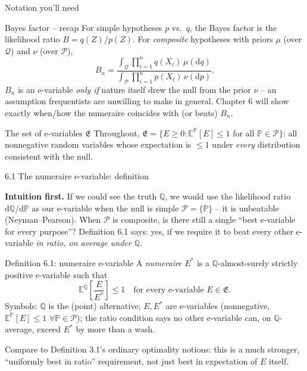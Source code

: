 \documentclass[aspectratio=169,10pt]{beamer}
\newcommand{\bE}{\mathbb{E}}
\newcommand{\bP}{\mathbb{P}}
\newcommand{\bQ}{\mathbb{Q}}
\newcommand{\cP}{\mathcal{P}}
\newcommand{\cQ}{\mathcal{Q}}
\newcommand{\cE}{\mathfrak{E}}
\begin{document}
\begin{frame}[allowframebreaks]{Notation you'll need}
\framebreak

\begin{block}{Bayes factor -- recap}
For simple hypotheses $p$ vs.\ $q$, the Bayes factor is the likelihood
ratio $B = q(Z)/p(Z)$. For \emph{composite} hypotheses with priors
$\mu$ (over $\cQ$) and $\nu$ (over $\cP$),
\[
B_n = \frac{\int_{\cQ} \prod_{i=1}^n q(X_i)\,\mu(\mathrm{d}q)}
{\int_{\cP} \prod_{i=1}^n p(X_i)\,\nu(\mathrm{d}p)}.
\]
$B_n$ is an e-variable \emph{only if} nature itself drew the null from
the prior $\nu$ -- an assumption frequentists are unwilling to make in
general. Chapter 6 will show exactly when/how the numeraire coincides
with (or beats) $B_n$.
\end{block}

\begin{block}{The set of e-variables $\cE$}
Throughout, $\cE = \{E \ge 0 : \bE^{\bP}[E] \le 1 \text{ for all } \bP \in \cP\}$:
all nonnegative random variables whose expectation is $\le 1$ under
\emph{every} distribution consistent with the null.
\end{block}
\end{frame}

\begin{frame}{6.1 The numeraire e-variable: definition}

\textbf{Intuition first.} If we could see the truth $\bQ$, we would use
the likelihood ratio $\mathrm{d}\bQ/\mathrm{d}\bP$ as our e-variable when
the null is simple $\cP=\{\bP\}$ -- it is unbeatable (Neyman--Pearson).
When $\cP$ is composite, is there still a single ``best e-variable for
every purpose''? Definition 6.1 says: yes, if we require it to beat
every other e-variable \emph{in ratio, on average under $\bQ$}.

\begin{block}{Definition 6.1: numeraire e-variable}
A \emph{numeraire} $E^*$ is a $\bQ$-almost-surely strictly positive
e-variable such that
\[
\bE^{\bQ}\!\left[\frac{E}{E^*}\right] \le 1 \quad \text{for every e-variable } E \in \cE.
\]
Symbols: $\bQ$ is the (point) alternative; $E, E^*$ are e-variables
(nonnegative, $\bE^{\bP}[E]\le 1$ $\forall \bP \in \cP$); the ratio
condition says no other e-variable can, on $\bQ$-average, exceed $E^*$
by more than a wash.
\end{block}

Compare to Definition 3.1's ordinary optimality notions: this is a much
stronger, ``uniformly best in ratio'' requirement, not just best in
expectation of $E$ itself.
\end{frame}
\end{document}
